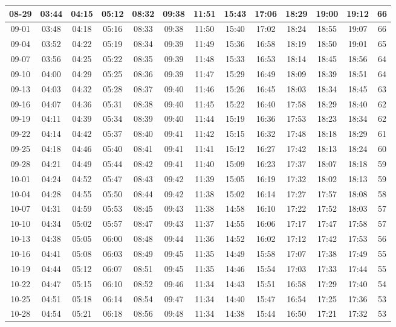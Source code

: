 \begin{footnotesize}
\begin{longtable}{c | c | c | c | c | c | c | c | c | c | c | c | c}
		08-29&03:44&04:15&05:12&08:32&09:38&11:51&15:43&17:06&18:29&19:00&19:12&66\\\hline
		09-01&03:48&04:18&05:16&08:33&09:38&11:50&15:40&17:02&18:24&18:55&19:07&66\\\hline
		09-04&03:52&04:22&05:19&08:34&09:39&11:49&15:36&16:58&18:19&18:50&19:01&65\\\hline
		09-07&03:56&04:25&05:22&08:35&09:39&11:48&15:33&16:53&18:14&18:45&18:56&64\\\hline
		09-10&04:00&04:29&05:25&08:36&09:39&11:47&15:29&16:49&18:09&18:39&18:51&64\\\hline
		09-13&04:03&04:32&05:28&08:37&09:40&11:46&15:26&16:45&18:03&18:34&18:45&63\\\hline
		09-16&04:07&04:36&05:31&08:38&09:40&11:45&15:22&16:40&17:58&18:29&18:40&62\\\hline
		09-19&04:11&04:39&05:34&08:39&09:40&11:44&15:19&16:36&17:53&18:23&18:34&62\\\hline
		09-22&04:14&04:42&05:37&08:40&09:41&11:42&15:15&16:32&17:48&18:18&18:29&61\\\hline
		09-25&04:18&04:46&05:40&08:41&09:41&11:41&15:12&16:27&17:42&18:13&18:24&60\\\hline
		09-28&04:21&04:49&05:44&08:42&09:41&11:40&15:09&16:23&17:37&18:07&18:18&59\\\hline
		10-01&04:24&04:52&05:47&08:43&09:42&11:39&15:05&16:19&17:32&18:02&18:13&59\\\hline
		10-04&04:28&04:55&05:50&08:44&09:42&11:38&15:02&16:14&17:27&17:57&18:08&58\\\hline
		10-07&04:31&04:59&05:53&08:45&09:43&11:38&14:58&16:10&17:22&17:52&18:03&57\\\hline
		10-10&04:34&05:02&05:57&08:47&09:43&11:37&14:55&16:06&17:17&17:47&17:58&57\\\hline
		10-13&04:38&05:05&06:00&08:48&09:44&11:36&14:52&16:02&17:12&17:42&17:53&56\\\hline
		10-16&04:41&05:08&06:03&08:49&09:45&11:35&14:49&15:58&17:07&17:38&17:49&55\\\hline
		10-19&04:44&05:12&06:07&08:51&09:45&11:35&14:46&15:54&17:03&17:33&17:44&55\\\hline
		10-22&04:47&05:15&06:10&08:52&09:46&11:34&14:43&15:51&16:58&17:29&17:40&54\\\hline
		10-25&04:51&05:18&06:14&08:54&09:47&11:34&14:40&15:47&16:54&17:25&17:36&53\\\hline
		10-28&04:54&05:21&06:18&08:56&09:48&11:34&14:38&15:44&16:50&17:21&17:32&53\\\hline

\end{longtable}
\end{footnotesize}
